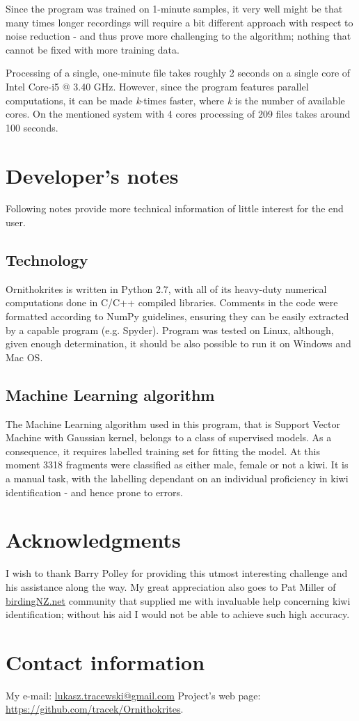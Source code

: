 \documentclass[paper=a4, fontsize=11pt]{scrartcl}	%
\numberwithin{equation}{section}		%
\numberwithin{figure}{section}			%
\numberwithin{table}{section}				%
\begin{document}
Since the program was trained on 1-minute samples, it very well might be that many times longer recordings will require a bit different approach with respect to noise reduction - and thus prove more challenging to the algorithm; nothing that cannot be fixed with more training data.

Processing of a single, one-minute file takes roughly 2 seconds on a single core of Intel Core-i5 @ 3.40 GHz. However, since the program features parallel computations, it can be made \textit{k}-times faster, where \textit{k} is the number of available cores. On the mentioned system with 4 cores processing of 209 files takes around 100 seconds.

\section{Developer's notes}
Following notes provide more technical information of little interest for the end user.
\subsection{Technology}
Ornithokrites is written in Python 2.7, with all of its heavy-duty numerical computations done in C/C++ compiled libraries. Comments in the code were formatted according to NumPy guidelines, ensuring they can be easily extracted by a capable program (e.g. Spyder). Program was tested on Linux, although, given enough determination, it should be also possible to run it on Windows and Mac OS.
\subsection{Machine Learning algorithm}
The Machine Learning algorithm used in this program, that is Support Vector Machine with Gaussian kernel, belongs to a class of supervised models. As a consequence, it requires labelled training set for fitting the model. At this moment 3318 fragments were classified as either male, female or not a kiwi. It is a manual task, with the labelling dependant on an individual proficiency in kiwi identification - and hence prone to errors.

\section{Acknowledgments}
I wish to thank Barry Polley for providing this utmost interesting challenge and his assistance along the way. My great appreciation also goes to Pat Miller of \url{birdingNZ.net} community that supplied me with invaluable help concerning kiwi identification; without his aid I would not be able to achieve such high accuracy.

\section{Contact information}
My e-mail: \href{mailto:lukasz.tracewski@gmail.com}{lukasz.tracewski@gmail.com}
\newline
Project's web page: \url{https://github.com/tracek/Ornithokrites}.

\end{document}
